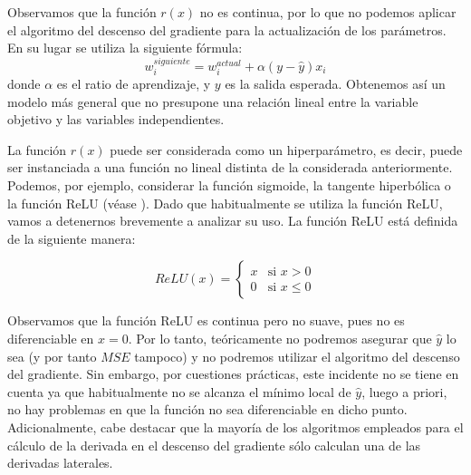 \documentclass[12pt, a4paper, twoside]{book}
\numberwithin{equation}{section}
\theoremstyle{definition}
\theoremstyle{remark}
\theoremstyle{plain}
\begin{document}
	Observamos que la función $r(x)$ no es continua, por lo que no 
	podemos aplicar el algoritmo del descenso del gradiente para la 
	actualización de los parámetros. En su lugar se utiliza la siguiente 
	fórmula:
	\begin{equation*}
		w_{i}^{siguiente}=w_{i}^{actual}+\alpha(y-\hat{y})x_{i}
	\end{equation*}
	donde $\alpha$ es el ratio de aprendizaje, y $y$ es la salida 
	esperada. Obtenemos así un modelo más general que no presupone una 
	relación lineal entre la variable objetivo y las variables 
	independientes. 
	
	La función $r(x)$ puede ser considerada como un hiperparámetro, es decir,
	puede ser instanciada a una función no lineal distinta de la considerada 
	anteriormente. Podemos, por ejemplo, considerar la función sigmoide, 
	la tangente hiperbólica o la función ReLU (véase 
	\cite{Goodfellow-et-al-2016}). Dado que habitualmente se utiliza la función ReLU, vamos a detenernos 
	brevemente a analizar su uso. La función ReLU está definida de la 
	siguiente manera:

	\begin{equation}
		\label{def:ReLU}
		ReLU(x)=\left \{
			\begin{array}{ll}
				x&\text{si }x>0\\
				0&\text{si }x\leq0
			\end{array} 
		     \right .
	\end{equation}
	
	Observamos que la función ReLU es continua pero no suave, pues no es 
	diferenciable en $x=0$. Por lo tanto, teóricamente no podremos 
	asegurar que $\hat{y}$ lo sea (y por tanto $MSE$ tampoco) y no 
	podremos utilizar el algoritmo del 
	descenso del gradiente. Sin embargo, por 
	cuestiones prácticas, este incidente no se tiene en cuenta ya que 
	habitualmente no se alcanza el mínimo local de $\hat{y}$, luego a 
	priori, no hay problemas en que la función no sea diferenciable en 
	dicho punto. Adicionalmente, cabe 
	destacar que la mayoría de los algoritmos empleados para el cálculo de 
	la derivada en el descenso del gradiente sólo calculan una de las 
	derivadas laterales.
\end{document}
